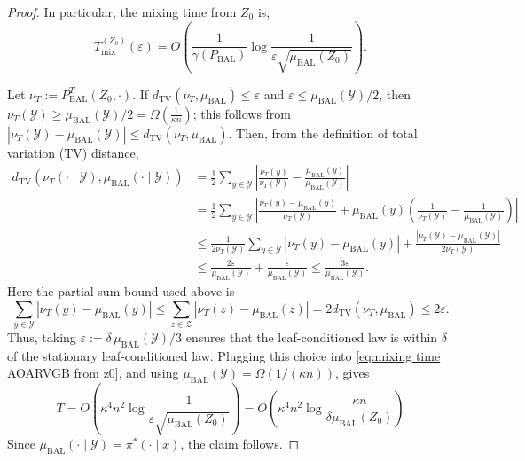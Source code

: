 \documentclass{article}
\numberwithin{theorem}{section}
\numberwithin{proposition}{section}
\numberwithin{corollary}{section}
\numberwithin{lemma}{section}
\numberwithin{conjecture}{section}
\numberwithin{remark}{section}
\numberwithin{definition}{section}
\numberwithin{assumption}{section}
\numberwithin{example}{section}
\newcommand{\calY}{{\mathcal{Y}}}
\newcommand{\calZ}{{\mathcal{Z}}}
\newcommand{\sbra}[1]{\left(#1\right)}
\newcommand{\abs}[1]{\left| #1\right|}
\begin{document}
\begin{proof}
In particular, the mixing time from $Z_0$ is,
\begin{equation}\label{eq:mixing time AOARVGB from z0}
    T_{\mathrm{mix}}^{(Z_0)}(\varepsilon)=O\sbra{\frac{1}{\gamma(P_{\mathrm{BAL}})} \log\frac{1}{\varepsilon\sqrt{\mu_{\mathrm{BAL}}(Z_0)}}}.
\end{equation}

Let $\nu_T:=P_{\mathrm{BAL}}^T(Z_0,\cdot)$. If
$d_{\mathrm{TV}}(\nu_T,\mu_{\mathrm{BAL}})\le \varepsilon$ and
$\varepsilon\le \mu_{\mathrm{BAL}}(\calY)/2$, then $\nu_T(\calY)\ge \mu_{\mathrm{BAL}}(\calY)/2 = \Omega\sbra{\frac{1}{\kappa n}}$; this follows from
$|\nu_T(\calY)-\mu_{\mathrm{BAL}}(\calY)|\le d_{\mathrm{TV}}(\nu_T,\mu_{\mathrm{BAL}})$.
Then, from the definition of total variation (TV) distance,
\begin{align*}
    d_{\mathrm{TV}}\sbra{\nu_T(\cdot\mid\calY),\mu_{\mathrm{BAL}}(\cdot\mid\calY)}
    &=\frac12\sum_{y\in\calY}
    \abs{\frac{\nu_T(y)}{\nu_T(\calY)}-\frac{\mu_{\mathrm{BAL}}(y)}{\mu_{\mathrm{BAL}}(\calY)}} \\
    &=\frac12\sum_{y\in\calY}
    \abs{\frac{\nu_T(y)-\mu_{\mathrm{BAL}}(y)}{\nu_T(\calY)}
    +\mu_{\mathrm{BAL}}(y)\sbra{\frac{1}{\nu_T(\calY)}-\frac{1}{\mu_{\mathrm{BAL}}(\calY)}}} \\
    &\le \frac{1}{2\nu_T(\calY)}\sum_{y\in\calY}\abs{\nu_T(y)-\mu_{\mathrm{BAL}}(y)}
    +\frac{\abs{\nu_T(\calY)-\mu_{\mathrm{BAL}}(\calY)}}{2\nu_T(\calY)} \\
    &\le \frac{2\varepsilon}{\mu_{\mathrm{BAL}}(\calY)}
    +\frac{\varepsilon}{\mu_{\mathrm{BAL}}(\calY)}
    \le \frac{3\varepsilon}{\mu_{\mathrm{BAL}}(\calY)}.
\end{align*}
Here the partial-sum bound used above is
\begin{equation*}
    \sum_{y\in\calY}\abs{\nu_T(y)-\mu_{\mathrm{BAL}}(y)}\le \sum_{z\in\calZ}\abs{\nu_T(z)-\mu_{\mathrm{BAL}}(z)}=2d_{\mathrm{TV}}(\nu_T,\mu_{\mathrm{BAL}})\le 2\varepsilon.
\end{equation*}
Thus, taking $\varepsilon:=\delta\,\mu_{\mathrm{BAL}}(\calY)/3$ ensures that the leaf-conditioned law is within $\delta$ of the stationary leaf-conditioned law.  
Plugging this choice into \eqref{eq:mixing time AOARVGB from z0}, and using
$\mu_{\mathrm{BAL}}(\calY)=\Omega(1/(\kappa n))$, gives
\begin{equation}\label{eq:mixing of balanced AOAR VGB general}
    T =O\sbra{\kappa^4 n^2
    \log\frac{1}{\varepsilon\sqrt{\mu_{\mathrm{BAL}}(Z_0)}}} =O\sbra{\kappa^4 n^2
    \log\frac{\kappa n}{\delta \mu_{\mathrm{BAL}}(Z_0)}}
\end{equation}
Since $\mu_{\mathrm{BAL}}(\cdot\mid\calY)=\pi^*(\cdot\mid x)$, the claim follows.


\end{proof}
\end{document}
